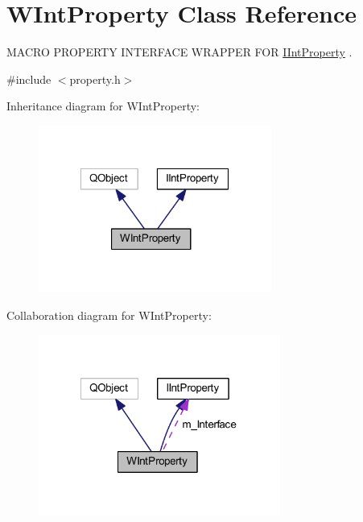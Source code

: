\hypertarget{class_w_int_property}{\section{W\-Int\-Property Class Reference}
\label{class_w_int_property}
}


M\-A\-C\-R\-O P\-R\-O\-P\-E\-R\-T\-Y I\-N\-T\-E\-R\-F\-A\-C\-E W\-R\-A\-P\-P\-E\-R F\-O\-R \hyperlink{class_i_int_property}{I\-Int\-Property} .  




{\ttfamily \#include $<$property.\-h$>$}



Inheritance diagram for W\-Int\-Property\-:
\nopagebreak
\begin{figure}[H]
\begin{center}
\leavevmode
\includegraphics[width=217pt]{class_w_int_property__inherit__graph}
\end{center}
\end{figure}


Collaboration diagram for W\-Int\-Property\-:
\nopagebreak
\begin{figure}[H]
\begin{center}
\leavevmode
\includegraphics[width=225pt]{class_w_int_property__coll__graph}
\end{center}
\end{figure}
